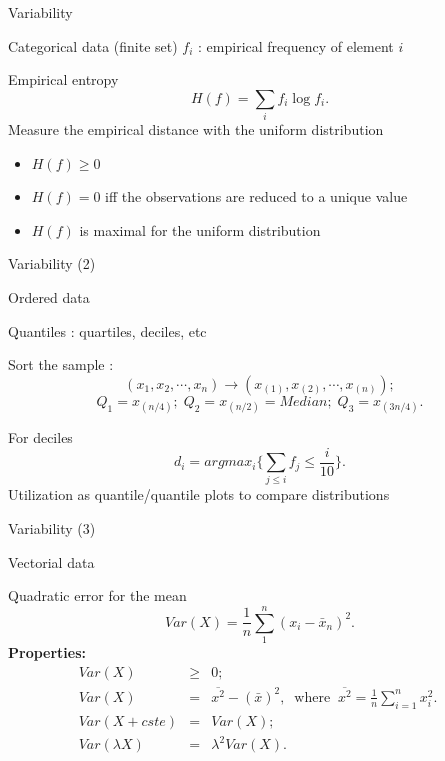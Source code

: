 \documentclass[xcolor=x11names,compress,8pt,
]{beamer}
\def\leq{\leqslant}
\def\geq{\geqslant}
\renewcommand{\(}{\begin{columns}}
\renewcommand{\)}{\end{columns}}
\newcommand{\<}[1]{\begin{column}{#1}}
\renewcommand{\>}{\end{column}}
\begin{document}
\begin{frame}{Variability}
\begin{block}{Categorical data (finite set)}
$f_i$ : empirical frequency of element $i$

Empirical entropy
\[
H(f)=\sum_i f_i \log f_i.\]
Measure the empirical distance with the uniform distribution
\begin{itemize}
\item $H(f)\geq 0$
\item $H(f)=0$ iff the observations are reduced to a unique value
\item $H(f)$ is maximal for the uniform distribution
\end{itemize} 
\end{block}
\end{frame}
\begin{frame}{Variability (2)}
\begin{block}{Ordered data }

Quantiles : quartiles, deciles, etc

Sort the sample : 
\[
(x_1,x_2,\cdots ,x_n)\longrightarrow  (x_{(1)},x_{(2)},\cdots ,x_{(n)});\]
\[
Q_1=x_{(n/4)};\; Q_2=x_{(n/2)}=Median;\; Q_3=x_{(3n/4)}.\]

For deciles
\[
d_i = argmax_i \{\sum_{j\leq i}f_j \leq \frac i {10}\}.\]
Utilization as quantile/quantile plots to compare distributions
\end{block}
\end{frame}
\begin{frame}{Variability (3)}
\begin{block}{ Vectorial data }

Quadratic error for the mean 
\[
Var(X)=\frac 1 n \sum_1^n (x_i-\bar{x}_n)^2.\]
{\bf Properties:}
\begin{eqnarray*}
Var(X) & \geq & 0;\\
Var(X)&=&\overline{x^2}-(\bar{x})^2, \;\;\mbox{where} \;\;\overline{x^2}=\frac 1 n \sum_{i=1}^n x_i^2.\;\\
Var(X+cste)&=&Var(X);\\
Var(\lambda X)&=&\lambda^2 Var(X).
\end{eqnarray*}

\end{block}
\end{frame}
\end{document}
